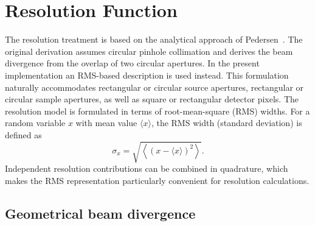 \clearpage \section{Resolution Function} 

The resolution treatment is based on the analytical approach of Pedersen~\cite{Pedersen1990}. The original derivation assumes circular pinhole collimation and derives the beam divergence from the overlap of two circular apertures. In the present implementation an RMS-based description is used instead. This formulation naturally accommodates rectangular or circular source apertures, rectangular or circular sample apertures, as well as square or rectangular detector pixels. The resolution model is formulated in terms of root-mean-square (RMS) widths. For a random variable $x$ with mean value $\langle x \rangle$, the RMS width (standard deviation) is defined as 
\begin{equation} 
\sigma_x = \sqrt{ \left\langle \left( x-\langle x\rangle \right)^2 \right\rangle }. 
\end{equation} 
Independent resolution contributions can be combined in quadrature, which makes the RMS representation particularly convenient for resolution calculations. 

\subsection{Geometrical beam divergence} 

